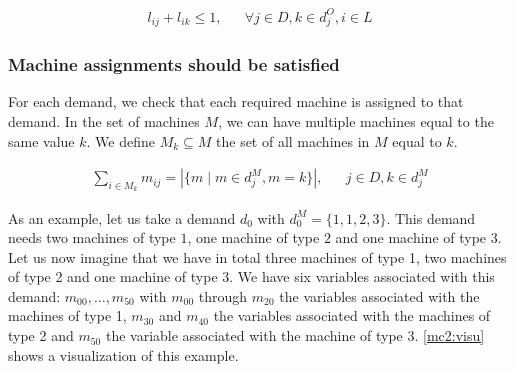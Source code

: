 \documentclass[../../thesis.tex]{subfiles}
\begin{document}
\begin{align}
  l_{ij} + l_{ik} \leq 1, && \forall j \in D, k \in d^O_j, i \in L \label{lc3}
\end{align}


\subsubsection{Machine assignments should be satisfied}

For each demand, we check that each required machine is assigned to that demand.
In the set of machines $M$, we can have multiple machines equal to the same value $k$.
We define $M_k \subseteq M$ the set of all machines in $M$ equal to $k$.

\begin{align}
  \sum_{i \in M_k} m_{ij} = | \{ m \mid m \in d_j^M, m = k \} |, && j \in D, k \in d^M_j \label{mc2}
\end{align}


As an example, let us take a demand $d_0$ with $d_0^M = \{ 1, 1, 2, 3 \}$. This demand needs 
two machines of type $1$, one machine of type $2$ and one machine of type $3$.
Let us now imagine that we have in total three machines of type 1, two machines of type 2 and one machine of type 3.
We have six variables associated with this demand: $m_{00}, \dots, m_{50}$ with 
$m_{00}$ through $m_{20}$ the variables associated with the machines of type 1, $m_{30}$ and $m_{40}$ the variables 
associated with the machines of type 2 and $m_{50}$ the variable associated with the machine of type 3.
\autoref{mc2:visu} shows a visualization of this example.
\end{document}
